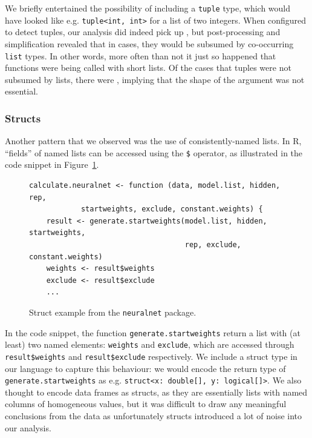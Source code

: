 \documentclass[acmsmall,review,anonymous]{acmart}\settopmatter{printfolios=true,printccs=false,printacmref=false}
\newcommand{\code}[1]{{\lstinline[style=Rin]!#1!}\xspace}
\begin{document}
We briefly entertained the possibility of including a \code{tuple} type, which would have looked like e.g. \code{tuple<int, int>} for a list of two integers.  
When configured to detect tuples, our analysis did indeed pick up , but post-processing and simplification revealed that in  cases, they would be subsumed by co-occurring \code{list} types.
In other words, more often than not it just so happened that functions were being called with short lists.  
Of the cases that tuples were not subsumed by lists,  there were , implying that the shape of the argument was not essential.


%
%
\subsubsection{Structs}
\label{subsec:structs}


Another pattern that we observed was the use of consistently-named lists.
In R, ``fields'' of named lists can be accessed using the \code{$} operator, as illustrated in the code snippet in Figure~\ref{fig:struct-ex}.

\begin{figure}[htbp]
\begin{center}

\begin{lstlisting}
calculate.neuralnet <- function (data, model.list, hidden, rep,
            startweights, exclude, constant.weights) {
    result <- generate.startweights(model.list, hidden, startweights,
                                    rep, exclude, constant.weights)
    weights <- result$weights
    exclude <- result$exclude
    ...
\end{lstlisting}

\caption{Struct example from the \code{neuralnet} package.}
\label{fig:struct-ex}
\end{center}
\end{figure}

In the code snippet, the function \code{generate.startweights} return a list with (at least) two named elements: \code{weights} and \code{exclude}, which are accessed through \code{result$weights} and \code{result$exclude} respectively.
We include a struct type in our language to capture this behaviour: we would encode the return type of \code{generate.startweights} as e.g. \code{struct<x: double[], y: logical[]>}.  
We also thought to encode data frames as structs, as they are essentially lists with named columns of homogeneous values, but it was difficult to draw any meaningful conclusions from the data as unfortunately structs introduced a lot of noise into our analysis.
\end{document}
